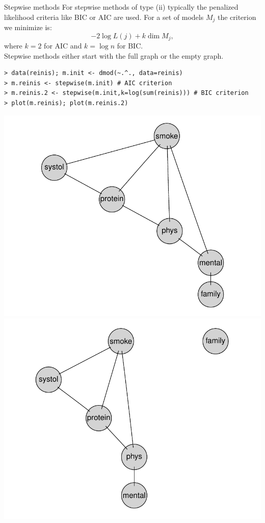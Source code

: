 \documentclass[11pt,handout,aspectratio=169,dvipsnames]{beamer}
\begin{document}
\begin{frame}[fragile]{Stepwise methods}
	For stepwise methods of type (ii) typically the penalized likelihood criteria like BIC or AIC are used. For a set of models $M_j$ the criterion we minimize is:
	$$
	-2\log L(j) + k \dim M_j,
	$$
	where $k=2$ for AIC and $k=\log n$ for BIC.\\[.3cm]
	Stepwise methods either start with the full graph or the empty graph.
		\begin{lstlisting}
> data(reinis); m.init <- dmod(~.^., data=reinis)
> m.reinis <- stepwise(m.init) # AIC criterion
> m.reinis.2 <- stepwise(m.init,k=log(sum(reinis))) # BIC criterion
> plot(m.reinis); plot(m.reinis.2)		
\end{lstlisting}
\begin{center}
	\includegraphics[scale=.3]{pics/reinis}\qquad\qquad \includegraphics[scale=.3]{pics/reinis2}
\end{center}
\end{frame}
\end{document}
